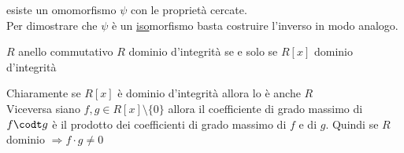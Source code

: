 \documentclass{article}
\begin{document}
esiste un omomorfismo $\psi$ con le proprietà cercate.\\
Per dimostrare che $\psi$ è un \underline{iso}morfismo basta costruire l'inverso in modo analogo.
\begin{prop}
	$R$ anello commutativo $R$ dominio d'integrità se e solo se $R[x]$ dominio d'integrità
\end{prop}
\begin{dimo}
	Chiaramente se $R[x]$ è dominio d'integrità allora lo è anche  $R$\\
	Viceversa siano $f,g\in R[x] \setminus\{0\}$ allora il coefficiente di grado massimo di $f\codt g$ è il prodotto dei coefficienti di grado massimo di $f$ e di $g$. Quindi se $R$ dominio $ \Rightarrow f\cdot g\neq 0$

\end{dimo}
\newpage
\end{document}
